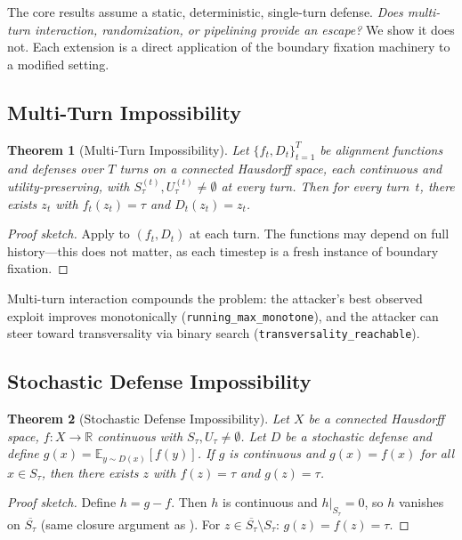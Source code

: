 \documentclass{article}
\newtheorem{theorem}{Theorem}[section]
\newcommand{\R}{\mathbb{R}}
\newcommand{\cl}[1]{\overline{#1}}
\begin{document}
The core results assume a static, deterministic, single-turn defense. \emph{Does multi-turn interaction, randomization,
or pipelining provide an escape?} We show it does not. Each extension
is a direct application of the boundary fixation machinery to a
modified setting.

\subsection{Multi-Turn Impossibility}

\begin{theorem}[Multi-Turn Impossibility]
\label{thm:multi-turn}
Let $\{f_t, D_t\}_{t=1}^T$ be alignment functions and defenses over
$T$ turns on a connected Hausdorff space, each continuous and
utility-preserving, with $S_\tau^{(t)}, U_\tau^{(t)} \neq \emptyset$
at every turn. Then for every turn~$t$, there exists $z_t$ with
$f_t(z_t) = \tau$ and $D_t(z_t) = z_t$.
\end{theorem}

\begin{proof}[Proof sketch]
Apply  to $(f_t, D_t)$ at each turn. The functions may
depend on full history---this does not matter, as each timestep is a
fresh instance of boundary fixation.
\end{proof}

Multi-turn interaction compounds the problem: the attacker's best
observed exploit improves monotonically
(\texttt{running\_max\_monotone}), and the attacker can steer toward
transversality via binary search (\texttt{transversality\_reachable}).

\subsection{Stochastic Defense Impossibility}

\begin{theorem}[Stochastic Defense Impossibility]
\label{thm:stochastic}
Let $X$ be a connected Hausdorff space, $f\colon X \to \R$ continuous
with $S_\tau, U_\tau \neq \emptyset$. Let $D$ be a stochastic defense
and define $g(x) = \mathbb{E}_{y \sim D(x)}[f(y)]$. If $g$ is
continuous and $g(x) = f(x)$ for all $x \in S_\tau$, then there
exists $z$ with $f(z) = \tau$ and $g(z) = \tau$.
\end{theorem}

\begin{proof}[Proof sketch]
Define $h = g - f$. Then $h$ is continuous and $h|_{S_\tau} = 0$,
so $h$ vanishes on $\cl{S_\tau}$ (same closure argument as
). For
$z \in \cl{S_\tau} \setminus S_\tau$: $g(z) = f(z) = \tau$.
\end{proof}
\end{document}
